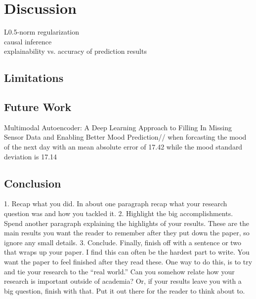 \documentclass[conference]{IEEEtran}
\begin{document}
\section{Discussion}
L0.5-norm regularization\\
causal inference\\
explainability vs. accuracy of prediction results\\

\subsection{Limitations}


\subsection{Future Work}
 Multimodal Autoencoder: A Deep Learning Approach to Filling In Missing Sensor Data and Enabling Better Mood Prediction\cite{jaques_multimodal_2017}//
 when forcasting the mood of the next day with an mean absolute error of 17.42 while the mood standard deviation is 17.14\cite{umematsu_forecasting_2020}

\subsection{Conclusion}
1. Recap what you did. In about one paragraph recap what your research question was and how you tackled it.
2. Highlight the big accomplishments. Spend another paragraph explaining the highlights of your results. These are the main results you want the reader to remember after they put down the paper, so ignore any small details.
3. Conclude. Finally, finish off with a sentence or two that wraps up your paper. I find this can often be the hardest part to write. You want the paper to feel finished after they read these. One way to do this, is to try and tie your research to the “real world.” Can you somehow relate how your research is important outside of academia? Or, if your results leave you with a big question, finish with that. Put it out there for the reader to think about to.


\color{black}






\end{document}
